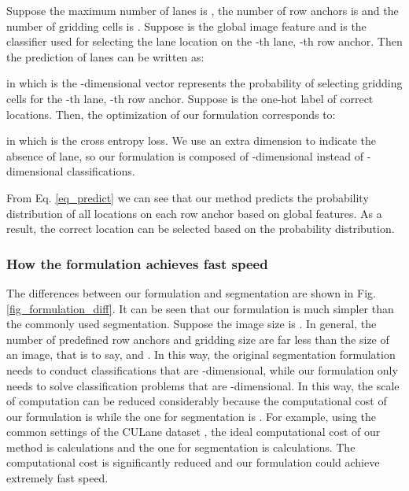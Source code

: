 \documentclass[runningheads]{llncs}
\begin{document}
Suppose the maximum number of lanes is , the number of row anchors is  and the number of gridding cells is . Suppose  is the global image feature and  is the classifier used for selecting the lane location on the -th lane, -th row anchor. Then the prediction of lanes can be written as:

in which  is the -dimensional vector represents the probability of selecting  gridding cells for the -th lane, -th row anchor. Suppose  is the one-hot label of correct locations. Then, the optimization of our formulation corresponds to:

in which  is the cross entropy loss. 
We use an extra dimension to indicate the absence of lane, so our formulation is composed of -dimensional instead of -dimensional classifications. 


From Eq. \ref{eq_predict} we can see that our method predicts the probability distribution of all locations on each row anchor based on global features. As a result, the correct location can be selected based on the probability distribution.

\begin{figure*}[t]
	\centering
	\caption{Illustration of our formulation and conventional segmentation. Our formulation is selecting locations (grids) on rows, while segmentation is classifying every pixel. The dimensions used for classifying are also different, which is marked in red. The proposed formulation significantly reduces the computational cost. Besides, the proposed formulation uses global features as input, which has larger receptive field than segmentation, thus addressing the \textit{no-visual-clue} problem}
	\label{fig_formulation_diff}
	\vspace{-10pt}
\end{figure*}


\subsubsection{How the formulation achieves fast speed}
The differences between our formulation and segmentation are shown in Fig. \ref{fig_formulation_diff}. It can be seen that our formulation is much simpler than the commonly used segmentation. Suppose the image size is . In general, the number of predefined row anchors and gridding size are far less than the size of an image, that is to say,  and . In this way, the original segmentation formulation needs to conduct  classifications that are -dimensional, while our formulation only needs to solve  classification problems that are -dimensional. In this way, the scale of computation can be reduced considerably because the computational cost of our formulation is  while the one for segmentation is . For example, using the common settings of the CULane dataset \cite{SCNN}, the ideal computational cost of our method is  calculations and the one for segmentation is  calculations. The computational cost is significantly reduced and our formulation could achieve extremely fast speed.
\end{document}
